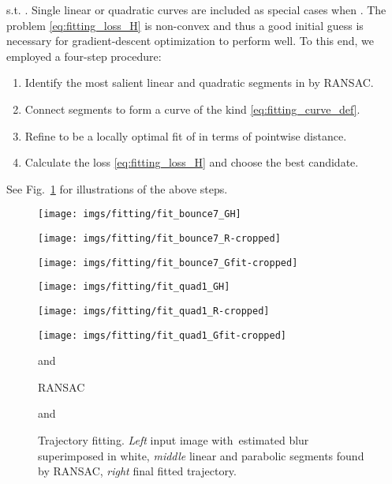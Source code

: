\documentclass[10pt,twocolumn,letterpaper]{article}
\begin{document}
s.t. . Single linear or quadratic curves are included as special cases when . 
The problem \eqref{eq:fitting_loss_H} is non-convex and thus a good initial guess is necessary for gradient-descent optimization to perform well. To this end, we employed a four-step procedure:
\vspace*{-0.5em}
\begin{enumerate}[leftmargin=*]
	\setlength\itemsep{-0.25em}
	\item Identify the most salient linear and quadratic segments in  by RANSAC.
	\item Connect segments to form a curve  of the kind \eqref{eq:fitting_curve_def}.
	\item Refine  to be a locally optimal fit of  in terms of pointwise distance.
	\item Calculate the loss \eqref{eq:fitting_loss_H} and choose the best candidate.
\end{enumerate}
\vspace*{-0.5em}
See Fig.~\ref{fig:fitting} for illustrations of the above steps. 
\begin{figure}
	\noindent\begin{minipage}[t]{.33\linewidth}
		\centering
		\texttt{[image: imgs/fitting/fit\_bounce7\_GH]}
	\end{minipage}\hfill \begin{minipage}[t]{.33\linewidth}
		\centering
		\texttt{[image: imgs/fitting/fit\_bounce7\_R-cropped]}
	\end{minipage}\hfill \begin{minipage}[t]{.33\linewidth}
		\centering
		\texttt{[image: imgs/fitting/fit\_bounce7\_Gfit-cropped]}
	\end{minipage}
\begin{minipage}[t]{.33\linewidth}
		\centering
		\texttt{[image: imgs/fitting/fit\_quad1\_GH]}
	\end{minipage}\hfill \begin{minipage}[t]{.33\linewidth}
		\centering
		\texttt{[image: imgs/fitting/fit\_quad1\_R-cropped]}
	\end{minipage}\hfill \begin{minipage}[t]{.33\linewidth}
		\centering
		\texttt{[image: imgs/fitting/fit\_quad1\_Gfit-cropped]}
	\end{minipage}
\begin{minipage}[t]{.33\linewidth}
		\centering
		 and 
	\end{minipage}\hfill \begin{minipage}[t]{.33\linewidth}
		\centering
		RANSAC
	\end{minipage}\hfill \begin{minipage}[t]{.33\linewidth}
		\centering
		 and 
	\end{minipage}
	\caption{Trajectory fitting. \emph{Left} input image with~estima\-ted blur superimposed in white, \emph{middle} linear and parabolic segments found by RANSAC, \emph{right} final fitted \mbox{trajectory.}}
	\label{fig:fitting}
\end{figure} 
\end{document}
